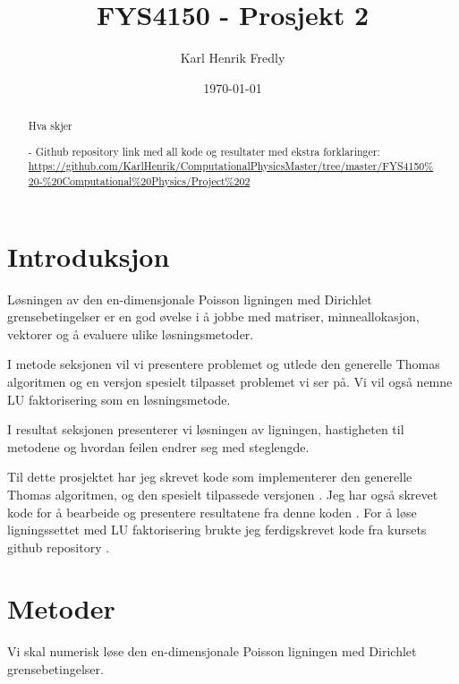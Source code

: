 \documentclass[reprint,english,notitlepage]{revtex4-1}
\begin{document}
	
\title{FYS4150 - Prosjekt 2}
\date{\today}               
\author{Karl Henrik Fredly}

\newpage
	
\begin{abstract} %
	Hva skjer
	
	- Github repository link med all kode og resultater med ekstra forklaringer: \href{https://github.com/KarlHenrik/ComputationalPhysicsMaster/tree/master/FYS4150\%20-\%20Computational\%20Physics/Project\%202}{https://github.com/KarlHenrik/ComputationalPhysicsMaster/tree/master/FYS4150\%20-\%20Computational\%20Physics/Project\%202}
\end{abstract}
\maketitle

\section{Introduksjon} %
	Løsningen av den en-dimensjonale Poisson ligningen med Dirichlet grensebetingelser er en god øvelse i å jobbe med matriser, minneallokasjon, vektorer og å evaluere ulike løsningsmetoder.
	
	I metode seksjonen vil vi presentere problemet og utlede den generelle Thomas algoritmen og en versjon spesielt tilpasset problemet vi ser på. Vi vil også nemne LU faktorisering som en løsningsmetode.
	
	I resultat seksjonen presenterer vi løsningen av ligningen, hastigheten til metodene og hvordan feilen endrer seg med steglengde.
	
	Til dette prosjektet har jeg skrevet kode som implementerer den generelle Thomas algoritmen, og den spesielt tilpassede versjonen \cite{myRepo}. Jeg har også skrevet kode for å bearbeide og presentere resultatene fra denne koden \cite{myRepo}. For å løse ligningssettet med LU faktorisering brukte jeg ferdigskrevet kode fra kursets github repository \cite{libRepo}\cite{cspRepo}.


\section{Metoder} %
	Vi skal numerisk løse den en-dimensjonale Poisson ligningen med Dirichlet grensebetingelser.
\end{document}
